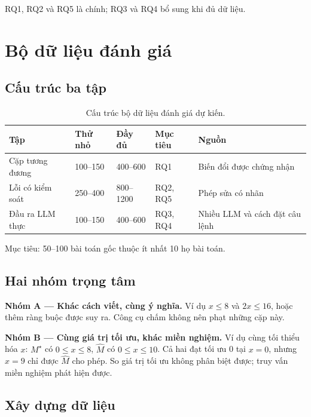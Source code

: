 \documentclass[11pt,a4paper]{article}
\theoremstyle{plain}
\theoremstyle{definition}
\theoremstyle{remark}
\newcommand{\GT}{M^{\star}}
\newcommand{\LLM}{\widehat{M}}
\begin{document}
RQ1, RQ2 và RQ5 là chính; RQ3 và RQ4 bổ sung khi đủ dữ liệu.

\section{Bộ dữ liệu đánh giá}

\subsection{Cấu trúc ba tập}

\begin{table}[H]
\centering
\caption{Cấu trúc bộ dữ liệu đánh giá dự kiến.}
\label{tab:benchmark}
\small
\begin{tabularx}{\textwidth}{L{3.2cm} C{1.8cm} C{2cm} Y L{2.5cm}}
\toprule
\textbf{Tập} & \textbf{Thử nhỏ} & \textbf{Đầy đủ} & \textbf{Mục tiêu} & \textbf{Nguồn} \\
\midrule
Cặp tương đương & 100--150 & 400--600 & RQ1 & Biến đổi được chứng nhận \\
Lỗi có kiểm soát & 250--400 & 800--1200 & RQ2, RQ5 & Phép sửa có nhãn \\
Đầu ra LLM thực & 100--150 & 400--600 & RQ3, RQ4 & Nhiều LLM và cách đặt câu lệnh \\
\bottomrule
\end{tabularx}
\end{table}

Mục tiêu: 50--100 bài toán gốc thuộc ít nhất 10 họ bài toán.

\subsection{Hai nhóm trọng tâm}

\textbf{Nhóm A --- Khác cách viết, cùng ý nghĩa.}
Ví dụ $x \leq 8$ và $2x \leq 16$, hoặc thêm ràng buộc được suy ra.
Công cụ chấm không nên phạt những cặp này.

\textbf{Nhóm B --- Cùng giá trị tối ưu, khác miền nghiệm.}
Ví dụ cùng tối thiểu hóa $x$: $\GT$ có $0 \leq x \leq 8$, $\LLM$ có $0 \leq x \leq 10$.
Cả hai đạt tối ưu 0 tại $x = 0$, nhưng $x = 9$ chỉ được $\LLM$ cho phép.
So giá trị tối ưu không phân biệt được; truy vấn miền nghiệm phát hiện được.

\subsection{Xây dựng dữ liệu}
\end{document}
